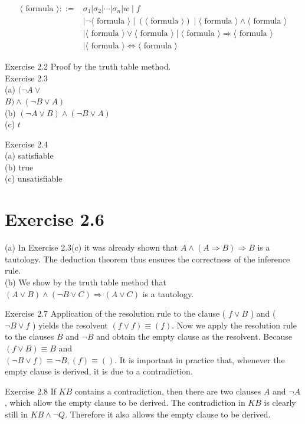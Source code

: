 \documentclass[10pt]{article}
\begin{document}
$$
\begin{aligned}
\langle\text { formula }\rangle::= & \sigma_{1}\left|\sigma_{2}\right| \cdots\left|\sigma_{n}\right| w \mid f \\
& \mid \neg\langle\text { formula }\rangle \mid(\langle\text { formula }\rangle) \mid\langle\text { formula }\rangle \wedge\langle\text { formula }\rangle \\
& \mid\langle\text { formula }\rangle \vee\langle\text { formula }\rangle \mid\langle\text { formula }\rangle \Rightarrow\langle\text { formula }\rangle \\
& \mid\langle\text { formula }\rangle \Leftrightarrow\langle\text { formula }\rangle
\end{aligned}
$$

Exercise 2.2 Proof by the truth table method.\\
Exercise 2.3\\
(a) $(\neg A \vee$\\
$B) \wedge(\neg B \vee A)$\\
(b) $(\neg A \vee B) \wedge(\neg B \vee A)$\\
(c) $t$

Exercise 2.4\\
(a) satisfiable\\
(b) true\\
(c) unsatisfiable

\section*{Exercise 2.6}
(a) In Exercise 2.3(c) it was already shown that $A \wedge(A \Rightarrow B) \Rightarrow B$ is a tautology. The deduction theorem thus ensures the correctness of the inference rule.\\
(b) We show by the truth table method that $(A \vee B) \wedge(\neg B \vee C) \Rightarrow(A \vee C)$ is a tautology.

Exercise 2.7 Application of the resolution rule to the clause ( $f \vee B$ ) and ( $\neg B \vee f$ ) yields the resolvent $(f \vee f) \equiv(f)$. Now we apply the resolution rule to the clauses $B$ and $\neg B$ and obtain the empty clause as the resolvent. Because $(f \vee B) \equiv B$ and\\
$(\neg B \vee f) \equiv \neg B,(f) \equiv()$. It is important in practice that, whenever the empty clause is derived, it is due to a contradiction.

Exercise 2.8 If $K B$ contains a contradiction, then there are two clauses $A$ and $\neg A$, which allow the empty clause to be derived. The contradiction in $K B$ is clearly still in $K B \wedge \neg Q$. Therefore it also allows the empty clause to be derived.
\end{document}
